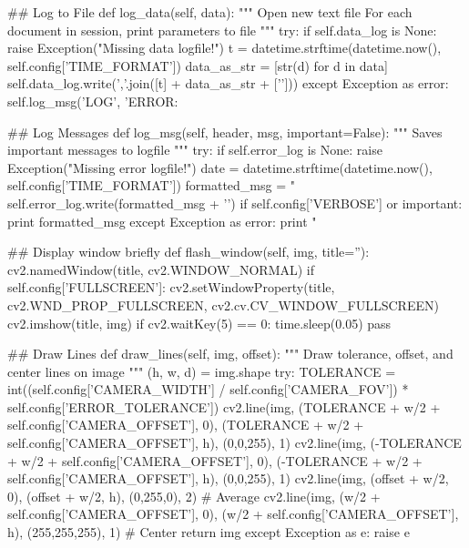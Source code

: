 \begin{python}
    ## Log to File
    def log_data(self, data):
        """
        Open new text file
        For each document in session, print parameters to file
        """
        try:
            if self.data_log is None: raise Exception("Missing data logfile!")
            t = datetime.strftime(datetime.now(), self.config['TIME_FORMAT'])
            data_as_str = [str(d) for d in data]
            self.data_log.write(','.join([t] + data_as_str + ['\n']))
        except Exception as error:
            self.log_msg('LOG', 'ERROR: %
    
    ## Log Messages
    def log_msg(self, header, msg, important=False):
        """
        Saves important messages to logfile
        """
        try:
            if self.error_log is None: raise Exception("Missing error logfile!")
            date = datetime.strftime(datetime.now(), self.config['TIME_FORMAT'])
            formatted_msg = "%
            self.error_log.write(formatted_msg + '\n')
            if self.config['VERBOSE'] or important: print formatted_msg
        except Exception as error:
            print "%
    
    ## Display window briefly
    def flash_window(self, img, title=''):
        cv2.namedWindow(title, cv2.WINDOW_NORMAL)
        if self.config['FULLSCREEN']: cv2.setWindowProperty(title, cv2.WND_PROP_FULLSCREEN, cv2.cv.CV_WINDOW_FULLSCREEN)
        cv2.imshow(title, img)
        if cv2.waitKey(5) == 0:
            time.sleep(0.05)            
            pass

    ## Draw Lines
    def draw_lines(self, img, offset):
        """
        Draw tolerance, offset, and center lines on image
        """
        (h, w, d) = img.shape
        try:
            TOLERANCE = int((self.config['CAMERA_WIDTH'] / self.config['CAMERA_FOV']) * self.config['ERROR_TOLERANCE']) 
            cv2.line(img, (TOLERANCE + w/2 + self.config['CAMERA_OFFSET'], 0), (TOLERANCE + w/2 + self.config['CAMERA_OFFSET'], h), (0,0,255), 1)
            cv2.line(img, (-TOLERANCE + w/2 + self.config['CAMERA_OFFSET'], 0), (-TOLERANCE + w/2 + self.config['CAMERA_OFFSET'], h), (0,0,255), 1)   
            cv2.line(img, (offset + w/2, 0), (offset + w/2, h), (0,255,0), 2) # Average
            cv2.line(img, (w/2 + self.config['CAMERA_OFFSET'], 0), (w/2 + self.config['CAMERA_OFFSET'], h), (255,255,255), 1) # Center
            return img
        except Exception as e:
            raise e


\end{python}
